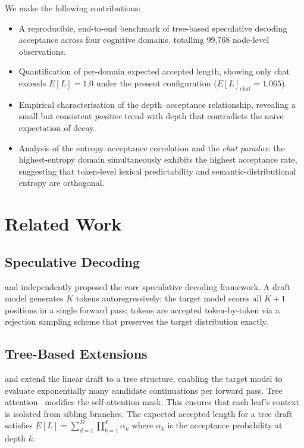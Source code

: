\documentclass[conference]{IEEEtran}
\begin{document}
We make the following contributions:
\begin{itemize}
  \item A reproducible, end-to-end benchmark of tree-based speculative
        decoding acceptance across four cognitive domains, totalling 99,768
        node-level observations.
  \item Quantification of per-domain expected accepted length, showing only
        chat exceeds $E[L]=1.0$ under the present configuration
        ($E[L]_{\text{chat}} = 1.065$).
  \item Empirical characterisation of the depth--acceptance relationship,
        revealing a small but consistent \emph{positive} trend with depth
        that contradicts the naive expectation of decay.
  \item Analysis of the entropy--acceptance correlation and the \emph{chat
        paradox}: the highest-entropy domain simultaneously exhibits the
        highest acceptance rate, suggesting that token-level lexical
        predictability and semantic-distributional entropy are orthogonal.
\end{itemize}

\section{Related Work}

\subsection{Speculative Decoding}
\citet{leviathan2023} and \citet{chen2023accelerating} independently proposed
the core speculative decoding framework. A draft model generates $K$ tokens
autoregressively; the target model scores all $K+1$ positions in a single
forward pass; tokens are accepted token-by-token via a rejection sampling
scheme that preserves the target distribution exactly.

\subsection{Tree-Based Extensions}
\citet{miao2024specinfer} and \citet{cai2024medusa} extend the linear draft
to a tree structure, enabling the target model to evaluate exponentially many
candidate continuations per forward pass. Tree attention~\cite{miao2024specinfer} modifies the self-attention mask. This ensures that each leaf's context is isolated from sibling branches. The expected accepted length for a tree draft satisfies
$E[L] = \sum_{d=1}^{D} \prod_{k=1}^{d} \alpha_k$ where $\alpha_k$ is the
acceptance probability at depth $k$.
\end{document}
